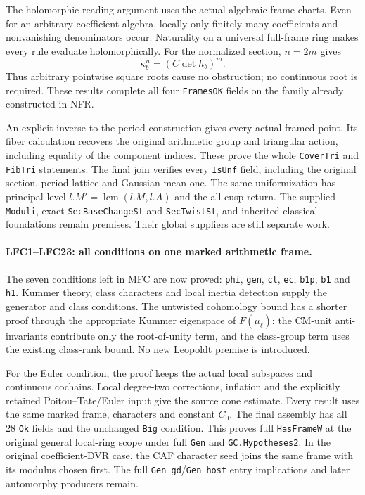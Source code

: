 \documentclass[11pt,a4paper]{article}
\numberwithin{equation}{section}
\theoremstyle{remark}\newtheorem{remark}[theorem]{Remark}
\begin{document}
The holomorphic reading argument uses the actual algebraic frame
charts. Even for an arbitrary coefficient algebra, locally only
finitely many coefficients and nonvanishing denominators occur.
Naturality on a universal full-frame ring makes every rule evaluate
holomorphically. For the normalized section, $n=2m$ gives
\[
 \kappa_b^n=(C\det h_b)^m.
\]
Thus arbitrary pointwise square roots cause no obstruction; no
continuous root is required. These results complete all four
\texttt{Frames\allowbreak OK} fields on the family already constructed in NFR.

An explicit inverse to the period construction gives every actual
framed point. Its fiber calculation recovers the original arithmetic
group and triangular action, including equality of the component
indices. These prove the whole \texttt{Cover\allowbreak Tri} and \texttt{Fib\allowbreak Tri}
statements. The final join verifies every \texttt{Is\allowbreak Unf} field,
including the original section, period lattice and Gaussian mean one.
The same uniformization has principal level
$l.M'=\operatorname{lcm}(l.M,l.A)$ and the all-cusp return.
The supplied \texttt{Moduli}, exact \texttt{Sec\allowbreak Base\allowbreak Change\allowbreak St} and
\texttt{Sec\allowbreak Twist\allowbreak St}, and inherited classical foundations remain
premises. Their global suppliers are still separate work.

\paragraph{LFC1--LFC23: all conditions on one marked arithmetic frame.}
The seven conditions left in MFC are now proved:
\texttt{phi}, \texttt{gen}, \texttt{cl}, \texttt{ec},
\texttt{b1p}, \texttt{b1} and \texttt{h1}.
Kummer theory, class characters and local inertia detection supply
the generator and class conditions. The untwisted cohomology bound
has a shorter proof through the appropriate Kummer eigenspace of
$F(\mu_\ell)$: the CM-unit anti-invariants contribute only the
root-of-unity term, and the class-group term uses the existing
class-rank bound. No new Leopoldt premise is introduced.

For the Euler condition, the proof keeps the actual local subspaces
and continuous cochains. Local degree-two corrections, inflation
and the explicitly retained Poitou--Tate/Euler input give the
source cone estimate. Every result uses the same marked frame,
characters and constant $C_0$. The final assembly has all 28
\texttt{Ok} fields and the unchanged \texttt{Big} condition.
This proves full \texttt{Has\allowbreak Frame\allowbreak W} at the original general
local-ring scope under full \texttt{Gen} and
\texttt{GC.\allowbreak Hypotheses2}. In the original coefficient-DVR case,
the CAF character seed joins the same frame with its modulus
chosen first. The full \texttt{Gen\_\allowbreak gd}/\texttt{Gen\_\allowbreak host}
entry implications and later automorphy producers remain.
\end{document}

